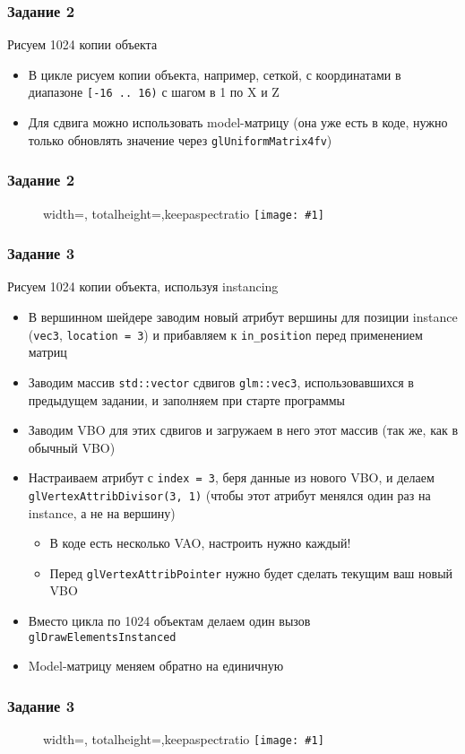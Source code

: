 \documentclass{beamer}
\newcommand{\slideimage}[1]{
  \begin{figure}
    \begin{adjustbox}{width=\textwidth, totalheight=\textheight-2\baselineskip-2\baselineskip,keepaspectratio}
      \texttt{[image: \#1]}
    \end{adjustbox}
  \end{figure}
}
\begin{document}
\begin{frame}[fragile]
\frametitle{Задание 2}
Рисуем 1024 копии объекта
\begin{itemize}
\item В цикле рисуем копии объекта, например, сеткой, с координатами в диапазоне \verb|[-16 .. 16)| с шагом в 1 по X и Z
\item Для сдвига можно использовать model-матрицу (она уже есть в коде, нужно только обновлять значение через \verb|glUniformMatrix4fv|)
\end{itemize}
\end{frame}

\begin{frame}
\frametitle{Задание 2}
\slideimage{2.png}
\end{frame}

\begin{frame}[fragile]
\fontsize{10pt}{10pt}
\selectfont
\frametitle{Задание 3}
Рисуем 1024 копии объекта, используя instancing
\begin{itemize}
\item В вершинном шейдере заводим новый атрибут вершины для позиции instance (\verb|vec3|, \verb|location = 3|) и прибавляем к \verb|in_position| перед применением матриц
\item Заводим массив \verb|std::vector| сдвигов \verb|glm::vec3|, использовавшихся в предыдущем задании, и заполняем при старте программы
\item Заводим VBO для этих сдвигов и загружаем в него этот массив (так же, как в обычный VBO)
\item Настраиваем атрибут с \verb|index = 3|, беря данные из нового VBO, и делаем \verb|glVertexAttribDivisor(3, 1)| (чтобы этот атрибут менялся один раз на instance, а не на вершину)
\begin{itemize}
\fontsize{10pt}{10pt}
\selectfont
\item В коде есть несколько VAO, настроить нужно каждый!
\item Перед \verb|glVertexAttribPointer| нужно будет сделать текущим ваш новый VBO
\end{itemize}
\item Вместо цикла по 1024 объектам делаем один вызов \verb|glDrawElementsInstanced|
\item Model-матрицу меняем обратно на единичную
\end{itemize}
\end{frame}

\begin{frame}
\frametitle{Задание 3}
\slideimage{2.png}
\end{frame}
\end{document}
